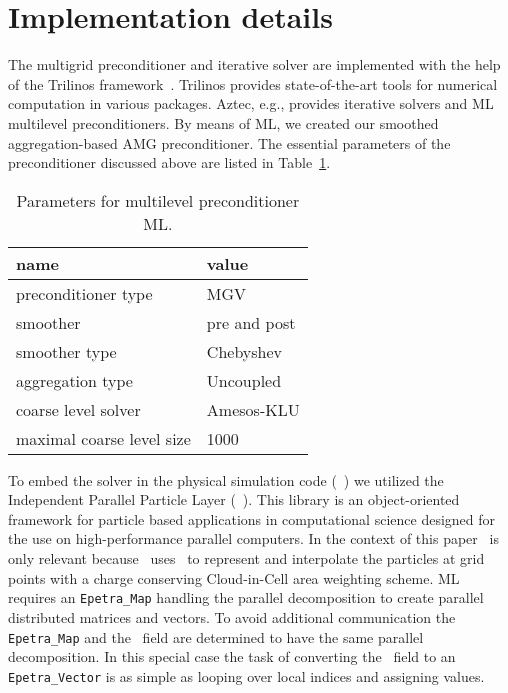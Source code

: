 \section{Implementation details}
\label{sec:impl}

The multigrid preconditioner and iterative solver are implemented with
the help of the Trilinos framework~\cite{Trilinos-Web-Site,
  Trilinos-TOMS}.  Trilinos provides state-of-the-art tools for
numerical computation in various packages.  Aztec, e.g., provides
iterative solvers and ML~\cite{gsht:06} multilevel preconditioners.  By
means of ML, we created our smoothed aggregation-based AMG
preconditioner.  The essential parameters of the preconditioner
discussed above are listed in Table~\ref{tab:sa_setup}.
\begin{table}[htb]
  \begin{center}
    \begin{tabular}{l|l}
      \hline
      name & value \\
      \hline
      preconditioner type & MGV \\
      smoother & pre and post \\
      smoother type & Chebyshev \\
      aggregation type & Uncoupled \\
      coarse level solver & Amesos-KLU \\
      maximal coarse level size & 1000 \\
      \hline
    \end{tabular}
    \caption{Parameters for multilevel preconditioner ML.}
    \label{tab:sa_setup}
  \end{center}
\end{table}

To embed the solver in the physical simulation code (\opal~\cite{opal})
we utilized the Independent Parallel Particle Layer (\ippl~\cite{ippl}).
This library is an object-oriented framework for particle based
applications in computational science designed for the use on
high-performance parallel computers.  In the context of this paper
\ippl\ is only relevant because \opal\ uses \ippl\ to represent and
interpolate the particles at grid points with a charge conserving
Cloud-in-Cell area weighting scheme.  ML requires an
\texttt{Epetra\_Map} handling the parallel decomposition to create
parallel distributed matrices and vectors. To avoid additional
communication the \texttt{Epetra\_Map} and the \ippl\ field are determined
to have the same parallel decomposition. In this special case the task
of converting the \ippl\ field to an \texttt{Epetra\_Vector} is as
simple as looping over local indices and assigning values.  

